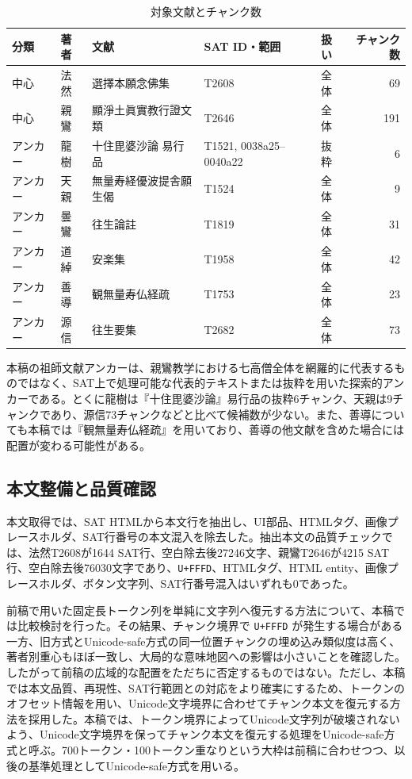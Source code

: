 \documentclass[uplatex,dvipdfmx,11pt,a4paper]{jsarticle}
\begin{document}
\begin{table}[H]
\centering
\small
\caption{対象文献とチャンク数}
\label{tab:corpus}
\begin{tabular}{@{}lllllr@{}}
\toprule
分類 & 著者 & 文献 & SAT ID・範囲 & 扱い & チャンク数 \\
\midrule
中心 & 法然 & 選擇本願念佛集 & T2608 & 全体 & 69 \\
中心 & 親鸞 & 顯淨土眞實教行證文類 & T2646 & 全体 & 191 \\
アンカー & 龍樹 & 十住毘婆沙論 易行品 & T1521, 0038a25--0040a22 & 抜粋 & 6 \\
アンカー & 天親 & 無量寿経優波提舎願生偈 & T1524 & 全体 & 9 \\
アンカー & 曇鸞 & 往生論註 & T1819 & 全体 & 31 \\
アンカー & 道綽 & 安楽集 & T1958 & 全体 & 42 \\
アンカー & 善導 & 観無量寿仏経疏 & T1753 & 全体 & 23 \\
アンカー & 源信 & 往生要集 & T2682 & 全体 & 73 \\
\bottomrule
\end{tabular}
\end{table}

本稿の祖師文献アンカーは、親鸞教学における七高僧全体を網羅的に代表するものではなく、SAT上で処理可能な代表的テキストまたは抜粋を用いた探索的アンカーである。とくに龍樹は『十住毘婆沙論』易行品の抜粋6チャンク、天親は9チャンクであり、源信73チャンクなどと比べて候補数が少ない。また、善導についても本稿では『観無量寿仏経疏』を用いており、善導の他文献を含めた場合には配置が変わる可能性がある。

\subsection{本文整備と品質確認}

本文取得では、SAT HTMLから本文行を抽出し、UI部品、HTMLタグ、画像プレースホルダ、SAT行番号の本文混入を除去した。抽出本文の品質チェックでは、法然T2608が1644 SAT行、空白除去後27246文字、親鸞T2646が4215 SAT行、空白除去後76030文字であり、\texttt{U+FFFD}、HTMLタグ、HTML entity、画像プレースホルダ、ボタン文字列、SAT行番号混入はいずれも0であった。

前稿で用いた固定長トークン列を単純に文字列へ復元する方法について、本稿では比較検討を行った。その結果、チャンク境界で \texttt{U+FFFD} が発生する場合がある一方、旧方式とUnicode-safe方式の同一位置チャンクの埋め込み類似度は高く、著者別重心もほぼ一致し、大局的な意味地図への影響は小さいことを確認した。したがって前稿の広域的な配置をただちに否定するものではない。ただし、本稿では本文品質、再現性、SAT行範囲との対応をより確実にするため、トークンのオフセット情報を用い、Unicode文字境界に合わせてチャンク本文を復元する方法を採用した。本稿では、トークン境界によってUnicode文字列が破壊されないよう、Unicode文字境界を保ってチャンク本文を復元する処理をUnicode-safe方式と呼ぶ。700トークン・100トークン重なりという大枠は前稿に合わせつつ、以後の基準処理としてUnicode-safe方式を用いる。
\end{document}
